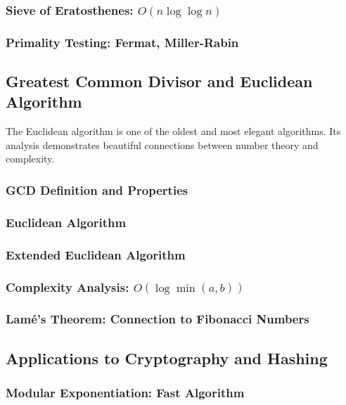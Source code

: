\subsubsection{Sieve of Eratosthenes: $O(n \log \log n)$}
\subsubsection{Primality Testing: Fermat, Miller-Rabin}

\subsection{Greatest Common Divisor and Euclidean Algorithm}
\label{subsec:gcd}

\begin{subsectionintro}
The Euclidean algorithm is one of the oldest and most elegant algorithms.
Its analysis demonstrates beautiful connections between number theory and complexity.
\end{subsectionintro}

\subsubsection{GCD Definition and Properties}
\subsubsection{Euclidean Algorithm}
\subsubsection{Extended Euclidean Algorithm}
\subsubsection{Complexity Analysis: $O(\log \min(a, b))$}
\subsubsection{Lamé's Theorem: Connection to Fibonacci Numbers}

\subsection{Applications to Cryptography and Hashing}
\label{subsec:crypto-hash}

\subsubsection{Modular Exponentiation: Fast Algorithm}
